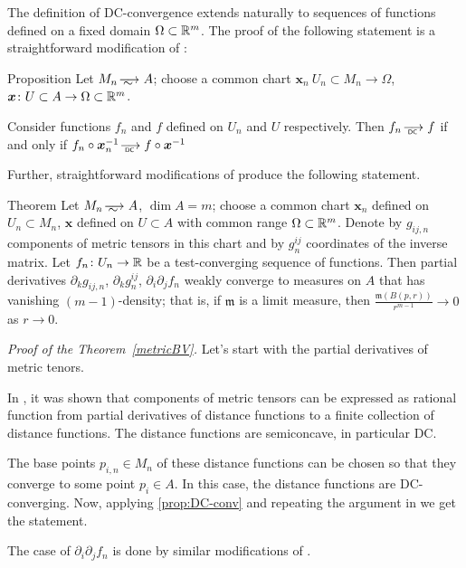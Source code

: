 The definition of DC-convergence extends naturally to sequences of functions defined on a fixed domain $\Omega\subset \mathbb{R}^m$.
The proof of the following statement is a straightforward modification of \cite[Section 3]{PerDC}:

\begin{thm}{Proposition}\label{prop:DC-conv}
Let $M_n\smooths{} A$;
choose a common chart $\bm{x}_n\:U_n\subset M_n\to \Omega$, $\bm{x}\colon U\subset A\to \Omega\subset \mathbb{R}^m$.

Consider functions $f_n$ and $f$ defined on $U_n$ and $U$ respectively.
Then $f_n\DCto f$ if and only if $f_n\circ \bm{x}_n^{-1}\DCto f\circ \bm{x}^{-1}$
\end{thm}

Further, straightforward modifications of \cite[Section 4]{PerDC} produce the following statement.

\begin{thm}{Theorem}\label{metricBV}
Let $M_n\smooths{} A$, $\dim A=m$; choose a common chart $\bm{x}_n$ defined on $U_n\subset M_n$, $\bm{x}$ defined on $U\subset A$ with common range $\Omega\subset \mathbb{R}^m$.
Denote by $g_{ij,n}$ components of metric tensors in this chart
and by $g^{ij}_n$ coordinates of the inverse matrix. 
Let $f_n\colon U_n\to \mathbb{R}$ be a test-converging sequence of functions.
Then partial derivatives $\partial_k g_{ij,n}$, $\partial_k g^{ij}_n$, $\partial_i\partial_jf_n$ weakly converge to measures on $A$ that has vanishing $(m-1)$-density;
that is, if $\mathfrak{m}$ is a limit measure, then $\frac{\mathfrak{m}(B(p,r))}{r^{m-1}}\to 0$ as $r\to 0$.
\end{thm}


{\it Proof of the Theorem~\ref{metricBV}.}
Let's start with the partial derivatives of metric tenors.

In \cite[Section 4.2]{PerDC}, it was shown that components of metric tensors can be expressed as rational function from partial derivatives of distance functions to a finite collection of distance functions.
The distance functions are semiconcave, in particular DC.

The base points $p_{i,n}\in M_n$ of these distance functions can be chosen so that they converge to some point $p_i\in A$.
In this case, the distance functions are DC-converging.
Now, applying \ref{prop:DC-conv} and repeating the argument in \cite[Section 4.3]{PerDC} we get the statement.

The case of $\partial_i\partial_jf_n$ is done by similar modifications of \cite[Section 4.4]{PerDC}.
\qeds






